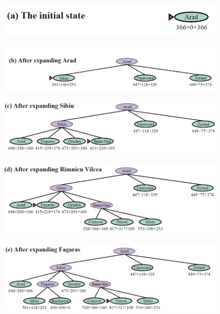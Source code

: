 		\begin{figure}[H]
			\centering
			\includegraphics[width=\textwidth]{img/A.png}
		\end{figure}
		\begin{figure}[H]
			\centering
			\includegraphics[width=\textwidth]{img/A1.png}
		\end{figure}\begin{figure}[H]
			\centering
			\includegraphics[width=\textwidth]{img/A2.png}
		\end{figure}\begin{figure}[H]
			\centering
			\includegraphics[width=\textwidth]{img/A3.png}
		\end{figure}\begin{figure}[H]
			\centering
			\includegraphics[width=\textwidth]{img/A4.png}

\end{figure}
